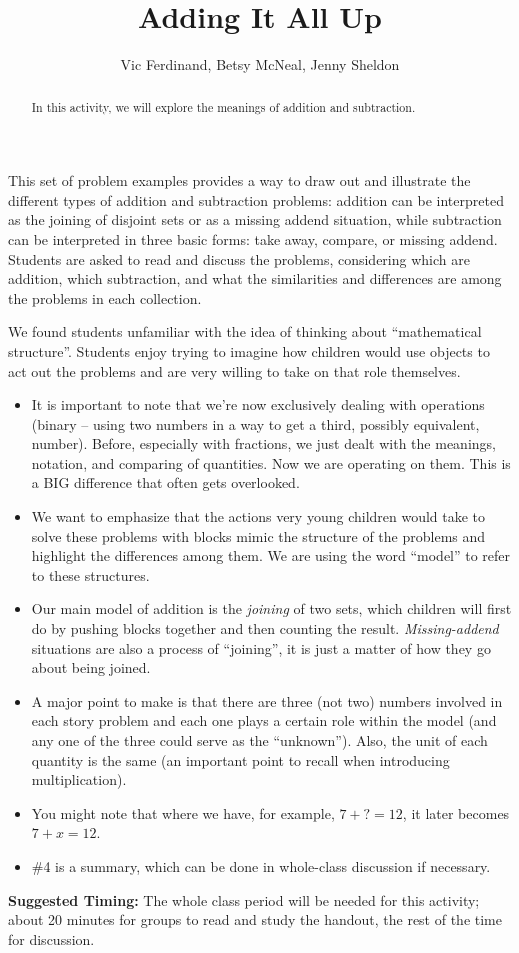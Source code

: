 \documentclass{ximera}
\title{Adding It All Up}
\author{Vic Ferdinand, Betsy McNeal, Jenny Sheldon}
\begin{document}
\begin{abstract} In this activity, we will explore the meanings of addition and subtraction. \end{abstract}
\maketitle

\begin{instructorIntro}
This set of problem examples provides a way to draw out and illustrate the different types of addition and subtraction problems:  addition can be interpreted as the joining of disjoint sets or as a missing addend situation, while subtraction can be interpreted in three basic forms: take away, compare, or missing addend.  Students are asked to read and discuss the problems, considering which are addition, which subtraction, and what the similarities and differences are among the problems in each collection.

We found students unfamiliar with the idea of thinking about ``mathematical structure''.  Students enjoy trying to imagine how children would use objects to act out the problems and are very willing to take on that role themselves.


\begin{itemize}
	\item It is important to note that we're now exclusively dealing with operations (binary -- using two numbers in a way to get a third, possibly equivalent, number). Before, especially with fractions, we just dealt with the meanings, notation, and comparing of quantities.  Now we are operating on them. This is a BIG difference that often gets overlooked.
	\item We want to emphasize that the actions very young children would take to solve these problems with blocks mimic the structure of the problems and highlight the differences among them.  We are using the word ``model'' to refer to these structures.
	\item Our main model of addition is the {\em joining} of two sets, which children will first do by pushing blocks together and then counting the result.  {\em Missing-addend} situations are also a process of ``joining'', it is just a matter of how they go about being joined.
	\item A major point to make is that there are three (not two) numbers involved in each story problem and each one plays a certain role within the model (and any one of the three could serve as the ``unknown'').  Also, the unit of each quantity is the same (an important point to recall when introducing multiplication).
	\item You might note that where we have, for example, $7 + ? = 12$, it later becomes $7 + x = 12$.
	\item \#4 is a summary, which can be done in whole-class discussion if necessary.
\end{itemize}

{\bf Suggested Timing:} The whole class period will be needed for this activity; about 20 minutes for groups to read and study the handout, the rest of the time for discussion. 
\end{instructorIntro}
\end{document}
